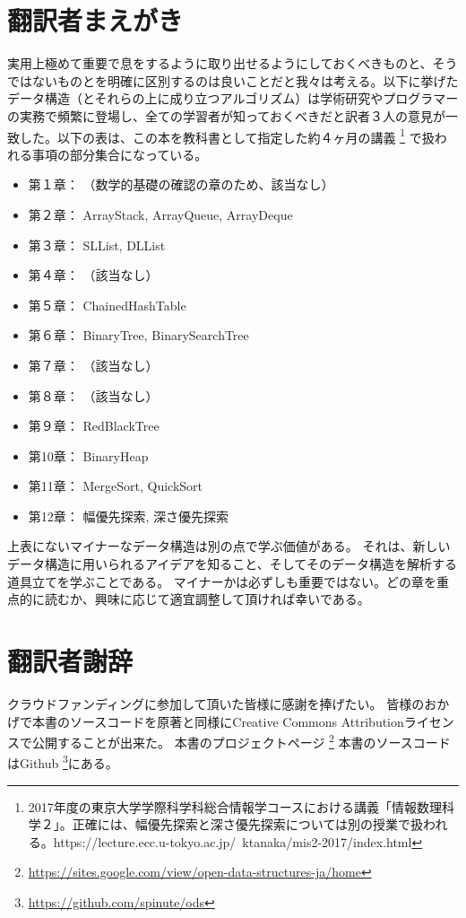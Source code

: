 \chapter*{翻訳者まえがき}

実用上極めて重要で息をするように取り出せるようにしておくべきものと、そうではないものとを明確に区別するのは良いことだと我々は考える。以下に挙げたデータ構造（とそれらの上に成り立つアルゴリズム）は学術研究やプログラマーの実務で頻繁に登場し、全ての学習者が知っておくべきだと訳者３人の意見が一致した。以下の表は、この本を教科書として指定した約４ヶ月の講義
\footnote{2017年度の東京大学学際科学科総合情報学コースにおける講義「情報数理科学２」。正確には、幅優先探索と深さ優先探索については別の授業で扱われる。https://lecture.ecc.u-tokyo.ac.jp/~ktanaka/mis2-2017/index.html}
で扱われる事項の部分集合になっている。


\begin{itemize}
  \item 第１章： （数学的基礎の確認の章のため、該当なし）
  \item 第２章： ArrayStack, ArrayQueue, ArrayDeque
  \item 第３章： SLList, DLList
  \item 第４章： （該当なし）
  \item 第５章： ChainedHashTable
  \item 第６章： BinaryTree, BinarySearchTree
  \item 第７章： （該当なし）
  \item 第８章： （該当なし）
  \item 第９章： RedBlackTree
  \item 第10章： BinaryHeap
  \item 第11章： MergeSort, QuickSort
  \item 第12章： 幅優先探索, 深さ優先探索
\end{itemize}

上表にないマイナーなデータ構造は別の点で学ぶ価値がある。
それは、新しいデータ構造に用いられるアイデアを知ること、そしてそのデータ構造を解析する道具立てを学ぶことである。
マイナーかは必ずしも重要ではない。どの章を重点的に読むか、興味に応じて適宜調整して頂ければ幸いである。


\chapter*{翻訳者謝辞}
クラウドファンディングに参加して頂いた皆様に感謝を捧げたい。
皆様のおかげで本書のソースコードを原著と同様にCreative Commons Attributionライセンスで公開することが出来た。
本書のプロジェクトページ \footnote {\url{https://sites.google.com/view/open-data-structures-ja/home}}
本書のソースコードはGithub \footnote {\url{https://github.com/spinute/ods}}にある。
